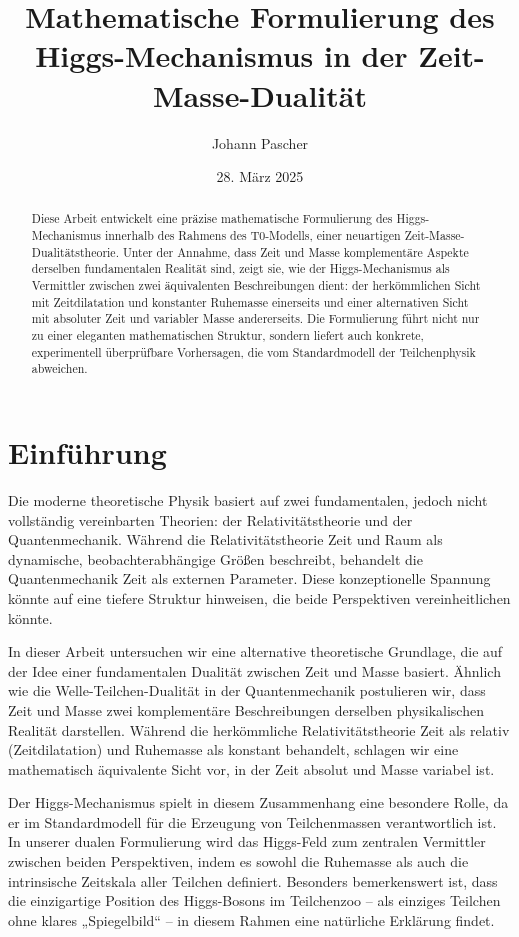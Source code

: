 \documentclass[a4paper,12pt]{article}
\title{Mathematische Formulierung des Higgs-Mechanismus in der Zeit-Masse-Dualität}
\author{Johann Pascher}
\date{28. März 2025}
\begin{document}
	
	\maketitle
	
	\begin{abstract}
		Diese Arbeit entwickelt eine präzise mathematische Formulierung des Higgs-Mechanismus innerhalb des Rahmens des T0-Modells, einer neuartigen Zeit-Masse-Dualitätstheorie. Unter der Annahme, dass Zeit und Masse komplementäre Aspekte derselben fundamentalen Realität sind, zeigt sie, wie der Higgs-Mechanismus als Vermittler zwischen zwei äquivalenten Beschreibungen dient: der herkömmlichen Sicht mit Zeitdilatation und konstanter Ruhemasse einerseits und einer alternativen Sicht mit absoluter Zeit und variabler Masse andererseits. Die Formulierung führt nicht nur zu einer eleganten mathematischen Struktur, sondern liefert auch konkrete, experimentell überprüfbare Vorhersagen, die vom Standardmodell der Teilchenphysik abweichen.
	\end{abstract}
	
	\tableofcontents
	\newpage
	
	\section{Einführung}
	Die moderne theoretische Physik basiert auf zwei fundamentalen, jedoch nicht vollständig vereinbarten Theorien: der Relativitätstheorie und der Quantenmechanik. Während die Relativitätstheorie Zeit und Raum als dynamische, beobachterabhängige Größen beschreibt, behandelt die Quantenmechanik Zeit als externen Parameter. Diese konzeptionelle Spannung könnte auf eine tiefere Struktur hinweisen, die beide Perspektiven vereinheitlichen könnte.
	
	In dieser Arbeit untersuchen wir eine alternative theoretische Grundlage, die auf der Idee einer fundamentalen Dualität zwischen Zeit und Masse basiert. Ähnlich wie die Welle-Teilchen-Dualität in der Quantenmechanik postulieren wir, dass Zeit und Masse zwei komplementäre Beschreibungen derselben physikalischen Realität darstellen. Während die herkömmliche Relativitätstheorie Zeit als relativ (Zeitdilatation) und Ruhemasse als konstant behandelt, schlagen wir eine mathematisch äquivalente Sicht vor, in der Zeit absolut und Masse variabel ist.
	
	Der Higgs-Mechanismus spielt in diesem Zusammenhang eine besondere Rolle, da er im Standardmodell für die Erzeugung von Teilchenmassen verantwortlich ist. In unserer dualen Formulierung wird das Higgs-Feld zum zentralen Vermittler zwischen beiden Perspektiven, indem es sowohl die Ruhemasse als auch die intrinsische Zeitskala aller Teilchen definiert. Besonders bemerkenswert ist, dass die einzigartige Position des Higgs-Bosons im Teilchenzoo – als einziges Teilchen ohne klares „Spiegelbild“ – in diesem Rahmen eine natürliche Erklärung findet.
	
\end{document}
